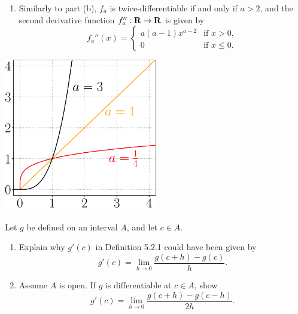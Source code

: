 \documentclass{lew98_solutions}
\begin{document}
\begin{solution}
\begin{enumerate}
        \item Similarly to part (b), \( f_a \) is twice-differentiable if and only if \( a > 2 \), and the second derivative function \( f_a'' : \mathbf{R} \to \mathbf{R} \) is given by
        \[
            f_a''(x) = \begin{cases}
                a (a - 1) x^{a - 2} & \text{if } x > 0, \\
                0 & \text{if } x \leq 0.
            \end{cases}
        \]
    \end{enumerate}
    \begin{center}
        \includegraphics[width=0.5\textwidth]{UA_Figures/UA_ex5_2_5_fig.pdf}
    \end{center}
\end{solution}

\begin{exercise}
\label{ex:5.2.6}
    Let \( g \) be defined on an interval \( A \), and let \( c \in A \).
    \begin{enumerate}
        \item Explain why \( g'(c) \) in Definition 5.2.1 could have been given by
        \[
            g'(c) = \lim_{h \to 0} \frac{g(c + h) - g(c)}{h}.
        \]

        \item Assume \( A \) is open. If \( g \) is differentiable at \( c \in A \), show
        \[
            g'(c) = \lim_{h \to 0} \frac{g(c + h) - g(c - h)}{2h}.
        \]
    \end{enumerate}
\end{exercise}
\end{document}
